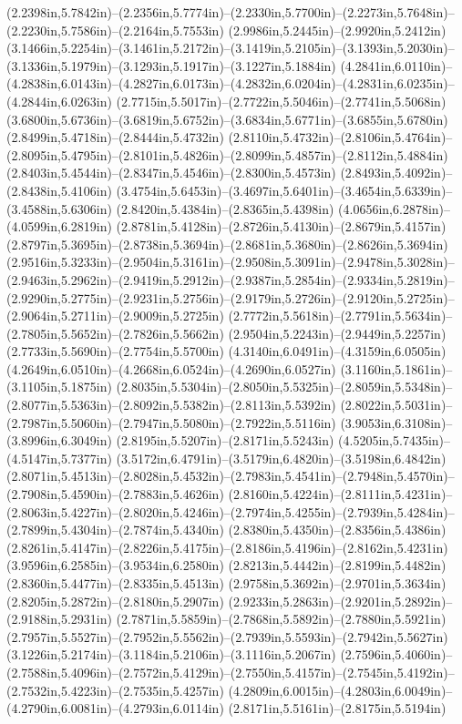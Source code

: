 (2.2398in,5.7842in)--(2.2356in,5.7774in)--(2.2330in,5.7700in)--(2.2273in,5.7648in)--(2.2230in,5.7586in)--(2.2164in,5.7553in) (2.9986in,5.2445in)--(2.9920in,5.2412in) (3.1466in,5.2254in)--(3.1461in,5.2172in)--(3.1419in,5.2105in)--(3.1393in,5.2030in)--(3.1336in,5.1979in)--(3.1293in,5.1917in)--(3.1227in,5.1884in) (4.2841in,6.0110in)--(4.2838in,6.0143in)--(4.2827in,6.0173in)--(4.2832in,6.0204in)--(4.2831in,6.0235in)--(4.2844in,6.0263in) (2.7715in,5.5017in)--(2.7722in,5.5046in)--(2.7741in,5.5068in) (3.6800in,5.6736in)--(3.6819in,5.6752in)--(3.6834in,5.6771in)--(3.6855in,5.6780in) (2.8499in,5.4718in)--(2.8444in,5.4732in) (2.8110in,5.4732in)--(2.8106in,5.4764in)--(2.8095in,5.4795in)--(2.8101in,5.4826in)--(2.8099in,5.4857in)--(2.8112in,5.4884in) (2.8403in,5.4544in)--(2.8347in,5.4546in)--(2.8300in,5.4573in) (2.8493in,5.4092in)--(2.8438in,5.4106in) (3.4754in,5.6453in)--(3.4697in,5.6401in)--(3.4654in,5.6339in)--(3.4588in,5.6306in) (2.8420in,5.4384in)--(2.8365in,5.4398in) (4.0656in,6.2878in)--(4.0599in,6.2819in) (2.8781in,5.4128in)--(2.8726in,5.4130in)--(2.8679in,5.4157in) (2.8797in,5.3695in)--(2.8738in,5.3694in)--(2.8681in,5.3680in)--(2.8626in,5.3694in) (2.9516in,5.3233in)--(2.9504in,5.3161in)--(2.9508in,5.3091in)--(2.9478in,5.3028in)--(2.9463in,5.2962in)--(2.9419in,5.2912in)--(2.9387in,5.2854in)--(2.9334in,5.2819in)--(2.9290in,5.2775in)--(2.9231in,5.2756in)--(2.9179in,5.2726in)--(2.9120in,5.2725in)--(2.9064in,5.2711in)--(2.9009in,5.2725in) (2.7772in,5.5618in)--(2.7791in,5.5634in)--(2.7805in,5.5652in)--(2.7826in,5.5662in) (2.9504in,5.2243in)--(2.9449in,5.2257in) (2.7733in,5.5690in)--(2.7754in,5.5700in) (4.3140in,6.0491in)--(4.3159in,6.0505in) (4.2649in,6.0510in)--(4.2668in,6.0524in)--(4.2690in,6.0527in) (3.1160in,5.1861in)--(3.1105in,5.1875in) (2.8035in,5.5304in)--(2.8050in,5.5325in)--(2.8059in,5.5348in)--(2.8077in,5.5363in)--(2.8092in,5.5382in)--(2.8113in,5.5392in) (2.8022in,5.5031in)--(2.7987in,5.5060in)--(2.7947in,5.5080in)--(2.7922in,5.5116in) (3.9053in,6.3108in)--(3.8996in,6.3049in) (2.8195in,5.5207in)--(2.8171in,5.5243in) (4.5205in,5.7435in)--(4.5147in,5.7377in) (3.5172in,6.4791in)--(3.5179in,6.4820in)--(3.5198in,6.4842in) (2.8071in,5.4513in)--(2.8028in,5.4532in)--(2.7983in,5.4541in)--(2.7948in,5.4570in)--(2.7908in,5.4590in)--(2.7883in,5.4626in) (2.8160in,5.4224in)--(2.8111in,5.4231in)--(2.8063in,5.4227in)--(2.8020in,5.4246in)--(2.7974in,5.4255in)--(2.7939in,5.4284in)--(2.7899in,5.4304in)--(2.7874in,5.4340in) (2.8380in,5.4350in)--(2.8356in,5.4386in) (2.8261in,5.4147in)--(2.8226in,5.4175in)--(2.8186in,5.4196in)--(2.8162in,5.4231in) (3.9596in,6.2585in)--(3.9534in,6.2580in) (2.8213in,5.4442in)--(2.8199in,5.4482in) (2.8360in,5.4477in)--(2.8335in,5.4513in) (2.9758in,5.3692in)--(2.9701in,5.3634in) (2.8205in,5.2872in)--(2.8180in,5.2907in) (2.9233in,5.2863in)--(2.9201in,5.2892in)--(2.9188in,5.2931in) (2.7871in,5.5859in)--(2.7868in,5.5892in)--(2.7880in,5.5921in) (2.7957in,5.5527in)--(2.7952in,5.5562in)--(2.7939in,5.5593in)--(2.7942in,5.5627in) (3.1226in,5.2174in)--(3.1184in,5.2106in)--(3.1116in,5.2067in) (2.7596in,5.4060in)--(2.7588in,5.4096in)--(2.7572in,5.4129in)--(2.7550in,5.4157in)--(2.7545in,5.4192in)--(2.7532in,5.4223in)--(2.7535in,5.4257in) (4.2809in,6.0015in)--(4.2803in,6.0049in)--(4.2790in,6.0081in)--(4.2793in,6.0114in) (2.8171in,5.5161in)--(2.8175in,5.5194in) 